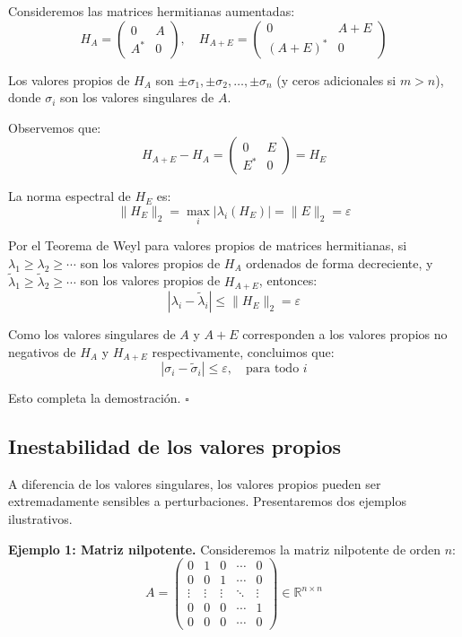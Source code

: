 \documentclass[12pt]{article}
\begin{document}
Consideremos las matrices hermitianas aumentadas:
\[
H_A = \begin{pmatrix}
0 & A \\
A^* & 0
\end{pmatrix}, \quad
H_{A+E} = \begin{pmatrix}
0 & A + E \\
(A + E)^* & 0
\end{pmatrix}
\]

Los valores propios de $H_A$ son $\pm\sigma_1, \pm\sigma_2, \ldots, \pm\sigma_n$ (y ceros adicionales si $m > n$), donde $\sigma_i$ son los valores singulares de $A$.

Observemos que:
\[
H_{A+E} - H_A = \begin{pmatrix}
0 & E \\
E^* & 0
\end{pmatrix} = H_E
\]

La norma espectral de $H_E$ es:
\[
\|H_E\|_2 = \max_{i} |\lambda_i(H_E)| = \|E\|_2 = \varepsilon
\]

Por el Teorema de Weyl para valores propios de matrices hermitianas, si $\lambda_1 \geq \lambda_2 \geq \cdots$ son los valores propios de $H_A$ ordenados de forma decreciente, y $\tilde{\lambda}_1 \geq \tilde{\lambda}_2 \geq \cdots$ son los valores propios de $H_{A+E}$, entonces:
\[
|\lambda_i - \tilde{\lambda}_i| \leq \|H_E\|_2 = \varepsilon
\]

Como los valores singulares de $A$ y $A + E$ corresponden a los valores propios no negativos de $H_A$ y $H_{A+E}$ respectivamente, concluimos que:
\[
|\sigma_i - \tilde{\sigma}_i| \leq \varepsilon, \quad \text{para todo } i
\]

Esto completa la demostración. $\square$

\subsection{Inestabilidad de los valores propios}

A diferencia de los valores singulares, los valores propios pueden ser extremadamente sensibles a perturbaciones. Presentaremos dos ejemplos ilustrativos.

\textbf{Ejemplo 1: Matriz nilpotente.}
Consideremos la matriz nilpotente de orden $n$:
\[
A = \begin{pmatrix}
0 & 1 & 0 & \cdots & 0 \\
0 & 0 & 1 & \cdots & 0 \\
\vdots & \vdots & \vdots & \ddots & \vdots \\
0 & 0 & 0 & \cdots & 1 \\
0 & 0 & 0 & \cdots & 0
\end{pmatrix} \in \mathbb{R}^{n \times n}
\]
\end{document}
